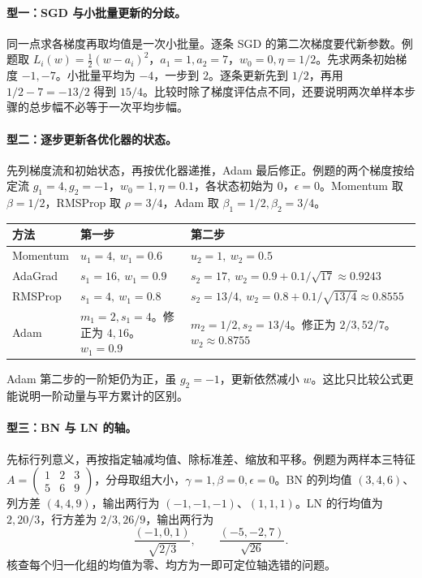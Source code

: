 \documentclass[UTF8,a4paper,zihao=-4,fontset=fandol]{ctexrep}
\begin{document}
\paragraph{型一：SGD 与小批量更新的分歧。}
同一点求各梯度再取均值是一次小批量。逐条 SGD 的第二次梯度要代新参数。例题取 $L_i(w)=\frac12(w-a_i)^2$，$a_1=1,a_2=7$，$w_0=0,\eta=1/2$。先求两条初始梯度 $-1,-7$。小批量平均为 $-4$，一步到 $2$。逐条更新先到 $1/2$，再用 $1/2-7=-13/2$ 得到 $15/4$。比较时除了梯度评估点不同，还要说明两次单样本步骤的总步幅不必等于一次平均步幅。

\paragraph{型二：逐步更新各优化器的状态。}
先列梯度流和初始状态，再按优化器递推，Adam 最后修正。例题的两个梯度按给定流 $g_1=4,g_2=-1$，$w_0=1,\eta=0.1$，各状态初始为 $0$，$\epsilon=0$。Momentum 取 $\beta=1/2$，RMSProp 取 $\rho=3/4$，Adam 取 $\beta_1=1/2,\beta_2=3/4$。

\begin{center}
\begin{tabularx}{\linewidth}{@{}lXX@{}}
\toprule
方法 & 第一步 & 第二步\\
\midrule
Momentum & $u_1=4,\ w_1=0.6$ & $u_2=1,\ w_2=0.5$\\
AdaGrad & $s_1=16,\ w_1=0.9$ & $s_2=17,\ w_2=0.9+0.1/\sqrt{17}\approx0.9243$\\
RMSProp & $s_1=4,\ w_1=0.8$ & $s_2=13/4,\ w_2=0.8+0.1/\sqrt{13/4}\approx0.8555$\\
Adam & $m_1=2,s_1=4$。修正为 $4,16$。$w_1=0.9$ & $m_2=1/2,s_2=13/4$。修正为 $2/3,52/7$。$w_2\approx0.8755$\\
\bottomrule
\end{tabularx}
\end{center}
Adam 第二步的一阶矩仍为正，虽 $g_2=-1$，更新依然减小 $w$。这比只比较公式更能说明一阶动量与平方累计的区别。

\paragraph{型三：BN 与 LN 的轴。}
先标行列意义，再按指定轴减均值、除标准差、缩放和平移。例题为两样本三特征 $A=\begin{pmatrix}1&2&3\\5&6&9\end{pmatrix}$，分母取组大小，$\gamma=1,\beta=0,\epsilon=0$。BN 的列均值 $(3,4,6)$、列方差 $(4,4,9)$，输出两行为 $(-1,-1,-1)$、$(1,1,1)$。LN 的行均值为 $2,20/3$，行方差为 $2/3,26/9$，输出两行为
\[
 \frac{(-1,0,1)}{\sqrt{2/3}},\qquad
 \frac{(-5,-2,7)}{\sqrt{26}} .
\]
核查每个归一化组的均值为零、均方为一即可定位轴选错的问题。
\end{document}
